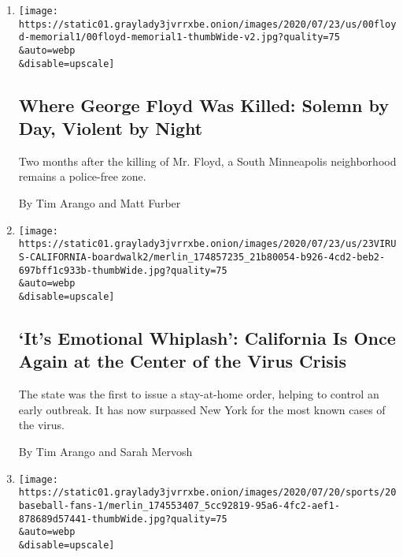 \begin{enumerate}
\def\labelenumi{\arabic{enumi}.}
\item
  \href{/2020/07/29/us/george-floyd-memorial.html}{}

  \texttt{[image: https://static01.graylady3jvrrxbe.onion/images/2020/07/23/us/00floyd-memorial1/00floyd-memorial1-thumbWide-v2.jpg?quality=75\\\&auto=webp\\\&disable=upscale]}

  \hypertarget{where-george-floyd-was-killed-solemn-by-day-violent-by-night}{%
  \subsection{Where George Floyd Was Killed: Solemn by Day, Violent by
  Night}\label{where-george-floyd-was-killed-solemn-by-day-violent-by-night}}

  Two months after the killing of Mr. Floyd, a South Minneapolis
  neighborhood remains a police-free zone.

  By Tim Arango and Matt Furber
\item
  \href{/2020/07/23/us/california-covid-19-cases.html}{}

  \texttt{[image: https://static01.graylady3jvrrxbe.onion/images/2020/07/23/us/23VIRUS-CALIFORNIA-boardwalk2/merlin\_174857235\_21b80054-b926-4cd2-beb2-697bff1c933b-thumbWide.jpg?quality=75\\\&auto=webp\\\&disable=upscale]}

  \hypertarget{its-emotional-whiplash-california-is-once-again-at-the-center-of-the-virus-crisis}{%
  \subsection{`It's Emotional Whiplash': California Is Once Again at the
  Center of the Virus
  Crisis}\label{its-emotional-whiplash-california-is-once-again-at-the-center-of-the-virus-crisis}}

  The state was the first to issue a stay-at-home order, helping to
  control an early outbreak. It has now surpassed New York for the most
  known cases of the virus.

  By Tim Arango and Sarah Mervosh
\item
  \href{/2020/07/20/sports/baseball/minor-leagues-coronavirus-fargo.html}{}

  \texttt{[image: https://static01.graylady3jvrrxbe.onion/images/2020/07/20/sports/20baseball-fans-1/merlin\_174553407\_5cc92819-95a6-4fc2-aef1-878689d57441-thumbWide.jpg?quality=75\\\&auto=webp\\\&disable=upscale]}


\end{enumerate}
